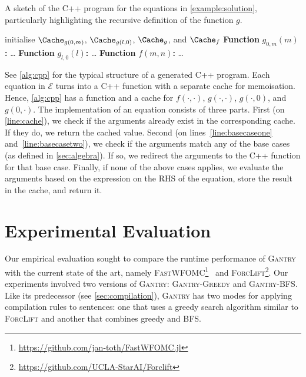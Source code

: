 \documentclass[a4paper,UKenglish,cleveref,autoref,thm-restate]{lipics-v2021}
\newcommand{\Cranetwo}{\textsc{Gantry}}
\newcommand{\Cranebfs}{\textsc{Gantry-BFS}}
\newcommand{\Cranegreedy}{\textsc{Gantry-Greedy}}
\begin{document}
\begin{algorithm}[t]
  \caption{A sketch of the C++ program for the equations in
    \cref{example:solution}, particularly highlighting the recursive definition
    of the function $g$.}\label{alg:cpp}
  initialise $\Cache_{g(0, m)}$, $\Cache_{g(l, 0)}$, $\Cache_{g}$, and
  $\Cache_{f}$\; \DontPrintSemicolon \textbf{Function} $g_{0,m}(m)$\textbf{:}
  \dots\; \textbf{Function} $g_{l,0}(l)$\textbf{:} \dots\; \PrintSemicolon
   \DontPrintSemicolon \textbf{Function} $f(m, n)$\textbf{:}
  \dots\; \PrintSemicolon {}
\end{algorithm}

See \cref{alg:cpp} for the typical structure of a generated C++ program. Each
equation in $\mathcal{E}$ turns into a C++ function with a separate cache for
memoisation. Hence, \cref{alg:cpp} has a function and a cache for
$f(\cdot, \cdot)$, $g(\cdot, \cdot)$, $g(\cdot, 0)$, and $g(0, \cdot)$. The
implementation of an equation consists of three parts. First (on
\autoref{line:cache}), we check if the arguments already exist in the
corresponding cache. If they do, we return the cached value. Second (on
lines~\ref{line:basecaseone} and~\ref{line:basecasetwo}), we check if the
arguments match any of the base cases (as defined in \cref{sec:algebra}). If so,
we redirect the arguments to the C++ function for that base case. Finally, if
none of the above cases applies, we evaluate the arguments based on the
expression on the RHS of the equation, store the result in the cache, and return
it.

\section{Experimental Evaluation}\label{sec:experiments}

Our empirical evaluation sought to compare the runtime performance of
{\Cranetwo} with the current state of the art, namely
\textsc{FastWFOMC}\footnote{\url{https://github.com/jan-toth/FastWFOMC.jl}}~\cite{DBLP:conf/kr/TothK24,DBLP:conf/uai/BremenK21}
and \textsc{ForcLift}\footnote{\url{https://github.com/UCLA-StarAI/Forclift}}.
Our experiments involved two versions of \Cranetwo{}: \Cranegreedy{} and
\Cranebfs{}. Like its predecessor (see \cref{sec:compilation}), \Cranetwo{} has
two modes for applying compilation rules to sentences: one that uses a greedy
search algorithm similar to \textsc{ForcLift} and another that combines greedy
and BFS\@.
\end{document}
